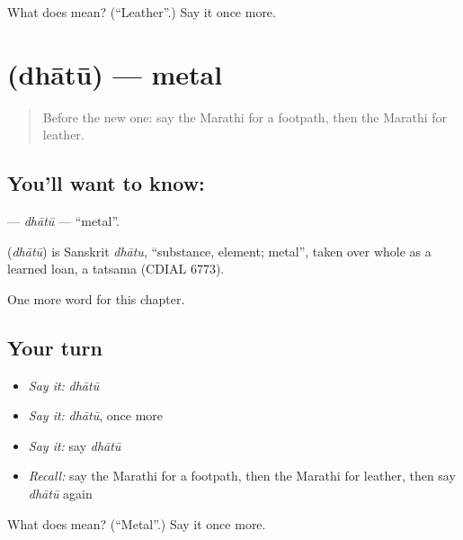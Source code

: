 \begin{tcolorbox}[breakable,colback=teal!4,colframe=teal!35!black,title={Before you move on}]
What does  mean? (\textquotedblleft{}Leather\textquotedblright{}.) Say it once more.
\end{tcolorbox}
\section[\texorpdfstring{\mr{धातू} (dhātū)}{धातू (dhātū)}]{ (dhātū) — metal}

\label{lesson:MR-C242-dhatu}



\begin{quote}
Before the new one: say the Marathi for a footpath, then the Marathi for leather.
\end{quote}

\subsection*{You'll want to know: }
\textbf{} — \emph{dhātū} — \textquotedblleft{}metal\textquotedblright{}.

\begin{cousinweb}
\textbf{} (\emph{dhātū}) is Sanskrit \emph{dhātu}, \textquotedblleft{}substance, element; metal\textquotedblright{}, taken over whole as a learned loan, a tatsama (CDIAL 6773).
\end{cousinweb}

\begin{grammarlens}[title={What you've built}]
One more word for this chapter.
\end{grammarlens}

\subsection*{Your turn}
\begin{itemize}
\raggedright
  \item \emph{Say it:} \emph{dhātū}
  \item \emph{Say it:} \emph{dhātū}, once more
  \item \emph{Say it:} say \emph{dhātū}
  \item \emph{Recall:} say the Marathi for a footpath, then the Marathi for leather, then say \emph{dhātū} again
\end{itemize}

\begin{tcolorbox}[breakable,colback=teal!4,colframe=teal!35!black,title={Before you move on}]
What does  mean? (\textquotedblleft{}Metal\textquotedblright{}.) Say it once more.
\end{tcolorbox}
